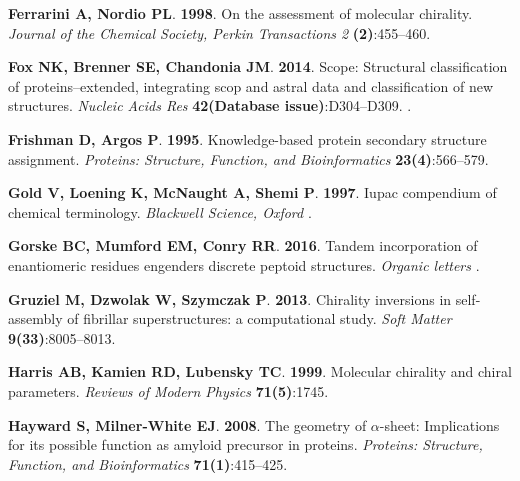 \documentclass[fleqn,10pt,lineno]{wlpeerj} %
\begin{document}
\begin{thebibliography}{58}
\textbf{Ferrarini A, Nordio PL}. \textbf{1998}.
\newblock On the assessment of molecular chirality.
\newblock \emph{Journal of the Chemical Society, Perkin Transactions 2}
  \textbf{(2)}:455--460.

\textbf{Fox NK, Brenner SE, Chandonia JM}. \textbf{2014}.
\newblock Scope: Structural classification of proteins--extended, integrating
  scop and astral data and classification of new structures.
\newblock \emph{Nucleic Acids Res} \textbf{42(Database issue)}:D304--D309.
\newblock {}.

\textbf{Frishman D, Argos P}. \textbf{1995}.
\newblock Knowledge-based protein secondary structure assignment.
\newblock \emph{Proteins: Structure, Function, and Bioinformatics}
  \textbf{23(4)}:566--579.

\textbf{Gold V, Loening K, McNaught A, Shemi P}. \textbf{1997}.
\newblock Iupac compendium of chemical terminology.
\newblock \emph{Blackwell Science, Oxford} .

\textbf{Gorske BC, Mumford EM, Conry RR}. \textbf{2016}.
\newblock Tandem incorporation of enantiomeric residues engenders discrete
  peptoid structures.
\newblock \emph{Organic letters} .

\textbf{Gruziel M, Dzwolak W, Szymczak P}. \textbf{2013}.
\newblock Chirality inversions in self-assembly of fibrillar superstructures: a
  computational study.
\newblock \emph{Soft Matter} \textbf{9(33)}:8005--8013.

\textbf{Harris AB, Kamien RD, Lubensky TC}. \textbf{1999}.
\newblock Molecular chirality and chiral parameters.
\newblock \emph{Reviews of Modern Physics} \textbf{71(5)}:1745.

\textbf{Hayward S, Milner-White EJ}. \textbf{2008}.
\newblock The geometry of $\alpha$-sheet: Implications for its possible
  function as amyloid precursor in proteins.
\newblock \emph{Proteins: Structure, Function, and Bioinformatics}
  \textbf{71(1)}:415--425.


\end{thebibliography}
\end{document}
